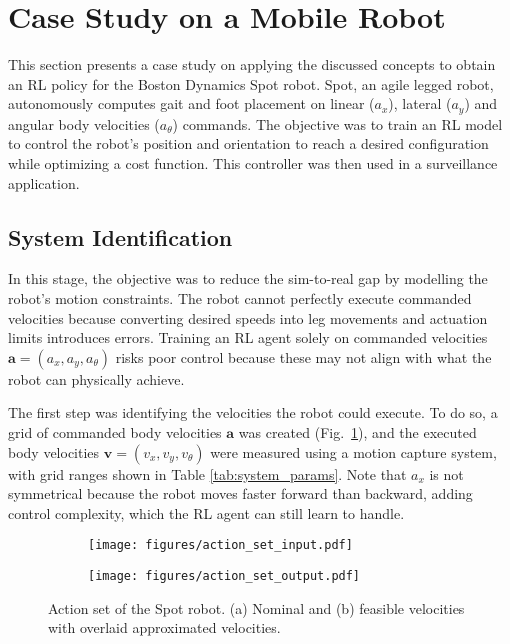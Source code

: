 \section{Case Study on a Mobile Robot}
\label{sec:case_study}

This section presents a case study on applying the discussed concepts to obtain an RL policy for the Boston Dynamics Spot robot. Spot, an agile legged robot, autonomously computes gait and foot placement on linear ($a_x$), lateral ($a_y$) and angular body velocities ($a_\theta$) commands. The objective was to train an RL model to control the robot's position and orientation to reach a desired configuration while optimizing a cost function. This controller was then used in a surveillance application.

\subsection{System Identification}
\label{sec:system_id}

In this stage, the objective was to reduce the sim-to-real gap by modelling the robot's motion constraints. The robot cannot perfectly execute commanded velocities because converting desired speeds into leg movements and actuation limits introduces errors. Training an RL agent solely on commanded velocities $\mathbf{a} = \left(a_x,a_y,a_\theta\right)$ risks poor control because these may not align with what the robot can physically achieve.

The first step was identifying the velocities the robot could execute. To do so, a grid of commanded body velocities $\mathbf{a}$  was created (Fig.\ \ref{fig:action_set_a}), and the executed body velocities $\mathbf{v} = \left(v_x,v_y,v_\theta\right)$ were measured using a motion capture system, with grid ranges shown in Table \ref{tab:system_params}. Note that $a_x$ is not symmetrical because the robot moves faster forward than backward, adding control complexity, which the RL agent can still learn to handle.

\begin{figure}%
  \begin{subfigure}[b]{0.45\linewidth}
    \centering
    \texttt{[image: figures/action\_set\_input.pdf]}
    \caption{} 
    \label{fig:action_set_a} 
  \end{subfigure}%
  \begin{subfigure}[b]{0.45\linewidth}
    \centering
    \texttt{[image: figures/action\_set\_output.pdf]} 
    \caption{} 
    \label{fig:action_set_b}
  \end{subfigure}%
  \caption{Action set of the Spot robot. (a) Nominal and (b) feasible velocities with overlaid approximated velocities. }
  \label{fig:action_set} 
\end{figure}

